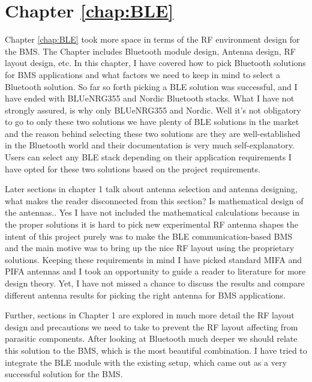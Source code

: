 \section*{Chapter \ref{chap:BLE}}
Chapter \ref{chap:BLE} took more space in terms of the RF environment design for the BMS. The Chapter includes Bluetooth module design, Antenna design, RF layout design, etc. In this chapter, I have covered how to pick Bluetooth solutions for BMS applications and what factors we need to keep in mind to select a Bluetooth solution. So far so forth picking a BLE solution was successful, and I have ended with BLUeNRG355 and Nordic Bluetooth stacks. What I have not strongly assured, is why only BLUeNRG355 and Nordic. Well it's not obligatory to go to only these two solutions we have plenty of BLE solutions in the market and the reason behind selecting these two solutions are they are well-established in the Bluetooth world and their documentation is very much self-explanatory.
Users can select any BLE stack depending on their application requirements I have opted for these two solutions based on the project requirements.

Later sections in chapter 1 talk about antenna selection and antenna designing, what makes the reader disconnected from this section? Is mathematical design of the antennas.. Yes I have not included the mathematical calculations because in the proper solutions it is hard to pick new experimental RF antenna shapes the intent of this project purely was to make the BLE communication-based BMS and the main motive was to bring up the nice RF layout using the proprietary solutions. Keeping these requirements in mind I have picked standard MIFA and PIFA antennas and I took an opportunity to guide a reader to literature for more design theory. Yet, I have not missed a chance to discuss the results and compare different antenna results for picking the right antenna for BMS applications.

Further, sections in Chapter 1 are explored in much more detail the RF layout design and precautions we need to take to prevent the RF layout affecting from parasitic components.
After looking at Bluetooth much deeper we should relate this solution to the BMS, which is the most beautiful combination. I have tried to integrate the BLE module with the existing setup, which came out as a very successful solution for the BMS.

